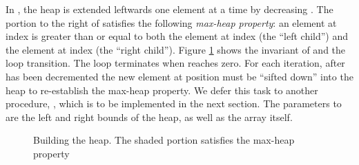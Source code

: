 \documentclass[english,submission]{eptcs}
\begin{document}
In , the heap is extended leftwards one element
at a time by decreasing . The portion to the right of
 satisfies the following \emph{max-heap property}: an
element at index  is greater than or equal to both the element
at index  (the {}``left child'') and the element at index
 (the {}``right child''). Figure \ref{fig:Building-the-heap}
shows the invariant of  and the loop transition.
The loop terminates when  reaches zero. For each iteration,
after  has been decremented the new element at position
 must be {}``sifted down'' into the heap to re-establish
the max-heap property. We defer this task to another procedure, ,
which is to be implemented in the next section. The parameters to
 are the left and right bounds of the heap, as
well as the array itself. 
\begin{figure}
\noindent \begin{centering}
\par\end{centering}

\caption[Building the heap]{Building the heap. The shaded portion satisfies the max-heap property\label{fig:Building-the-heap}}
\end{figure}
\end{document}
